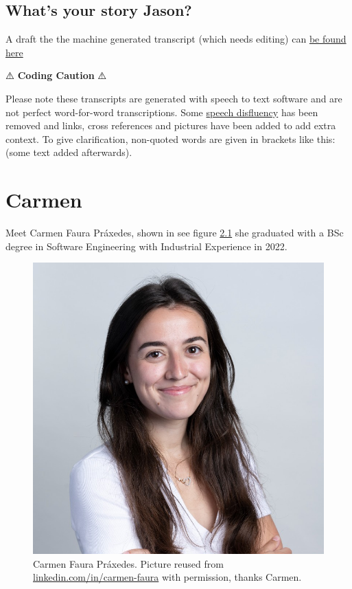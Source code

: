 \documentclass[
]{book}
\begin{document}
\hypertarget{jason-story}{%
\section{What's your story Jason?}\label{jason-story}}

A draft the the machine generated transcript (which needs editing) can \href{https://github.com/dullhunk/cdyf/blob/master/24-jason.md}{be found here}

⚠️ \textbf{Coding Caution} ⚠️

Please note these transcripts are generated with speech to text software and are not perfect word-for-word transcriptions. Some \href{https://en.wikipedia.org/wiki/Speech_disfluency}{speech disfluency} has been removed and links, cross references and pictures have been added to add extra context. To give clarification, non-quoted words are given in brackets like this: (some text added afterwards).

\hypertarget{carmen}{%
\chapter{Carmen}\label{carmen}}

Meet Carmen Faura Práxedes, shown in see figure \ref{fig:carmen-fig} she graduated with a BSc degree in Software Engineering with Industrial Experience in 2022.

\begin{figure}

{\centering \includegraphics[width=1\linewidth]{images/carmen} 

}

\caption{Carmen Faura Práxedes. Picture reused from \href{https://www.linkedin.com/in/carmen-faura/}{linkedin.com/in/carmen-faura} with permission, thanks Carmen.}\label{fig:carmen-fig}
\end{figure}
\end{document}
